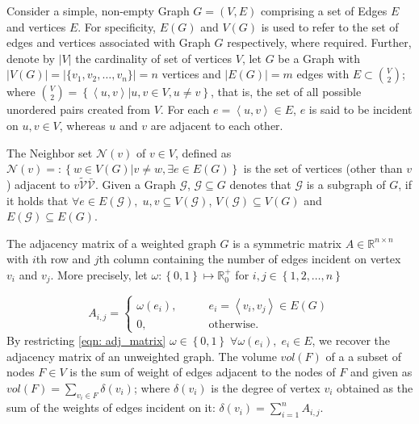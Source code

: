 Consider a simple, non-empty Graph $G = (V, E)$ comprising a set of Edges $E$ and vertices $E$.
For specificity, $E(G)$ and $V(G)$ is used to refer to the set of edges and vertices associated
with Graph $G$ respectively, where required. Further, denote by $|V|$ the cardinality of set of
vertices $V$, let $G$ be a Graph with $|V(G)| = |\{v_1, v_2, \ldots, v_n \}| = n$ vertices and
$|E(G)| = m$ edges with $E \subset \binom{V}{2} $;
where $\binom{V}{2} = \left\{\left\langle u,v\right\rangle | u,v \in V, u \neq v \right\} $, that is,
the set of all possible unordered pairs created from $V$. For each $e = \left\langle u, v\right\rangle \in E$,
$e$ is said to be incident on $u,v\in V$, whereas $u$ and $v$ are adjacent to each other.

The Neighbor set $\mathcal{N}(v)$ of $v \in V$, defined as
$\mathcal{N}(v) =: \left\{w  \in V(G) | v \neq w, \exists e \in E(G)\right\} $  is the set of vertices
(other than $v$) adjacent to $v \tilde{\mathcal{V}}  \bar{\mathcal{V}}$. Given a Graph $\mathcal{G}$,
$\mathcal{G} \subseteq G$ denotes that $\mathcal{G}$ is a subgraph of $G$, if it holds that
$\forall e \in E(\mathcal{G}),  \; u,v \subseteq V(\mathcal{G})$, $V(\mathcal{G}) \subseteq V(G)$
and $E(\mathcal{G}) \subseteq E(G)$.

The adjacency matrix of a weighted graph $G$ is a symmetric matrix $A \in \mathbb{R}^{n \times n}$ with $i$th row and $j$th
column containing the number of edges incident on vertex $v_i$ and $v_j$. More precisely,
let $\omega : \left\{ 0,1 \right\} \mapsto \mathbb{R}^+_0$ for $i,j \in \left\{1,2, \ldots, n \right\} $

\begin{equation}\label{eqn: adj_matrix}
  A_{i,j} = \begin{cases}
    \omega (e_i), & \qquad e_i = \left\langle v_i, v_j\right\rangle \in E(G) \\
    0,            & \qquad \text{otherwise.}
  \end{cases}
\end{equation}
By restricting \eqref{eqn: adj_matrix} $\omega \in \left\{ 0,1 \right\} \;\forall  \omega  (e_i), \; e_i  \in E$, we recover the
adjacency matrix of an unweighted graph. The volume $vol(F)$ of a a subset of nodes $F \in V$ is the sum of weight of edges adjacent
to the nodes of $F$ and given as $vol(F) = \sum_{v_i \in F}  \delta(v_i)$; where $\delta(v_i)$ is the degree of vertex $v_i$ obtained
as the sum of the weights of edges incident on it: $\delta(v_i) = \sum_{i = 1}^{n} A_{i,j} $.

